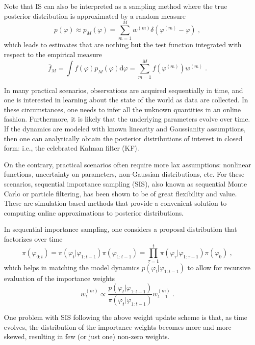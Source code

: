 \documentclass{article}
\newcommand{\ie}{i.e., }
\begin{document}
Note that IS can also be interpreted as a sampling method where the true posterior distribution is approximated by a random measure
\begin{equation}
p(\varphi) \approx p_M(\varphi) = \sum_{m=1}^M w^{(m)} \delta\left(\varphi^{(m)}-\varphi\right) \;,
\end{equation}
which leads to estimates that are nothing but the test function integrated with respect to the empirical measure
\begin{equation}
\bar{f}_M=\int f(\varphi) p_M(\varphi) \mathrm{d}\varphi =  \sum_{m=1}^M f\left(\varphi^{(m)}\right) w^{(m)} \; .
\end{equation}

In many practical scenarios, observations are acquired sequentially in time, and one is interested in learning about the state of the world as data are collected. In these circumstances, one needs to infer all the unknown quantities in an online fashion. Furthermore, it is likely that the underlying parameters evolve over time.  If the dynamics are modeled with known linearity and Gaussianity assumptions, then one can analytically obtain the posterior distributions of interest in closed form: \ie the celebrated Kalman \cite{j-kalm1960} filter (KF).

On the contrary, practical scenarios often require more lax assumptions: nonlinear functions, uncertainty on parameters, non-Gaussian distributions, etc. For these scenarios, sequential importance sampling (SIS), also known as sequential Monte Carlo or particle filtering, has been shown to be of great flexibility and value. These are simulation-based methods that provide a convenient solution to computing online approximations to posterior distributions.

In sequential importance sampling, one considers a proposal distribution that factorizes over time
\begin{equation}
\pi(\varphi_{0:t})=\pi(\varphi_t|\varphi_{1:t-1}) \pi(\varphi_{1:t-1})=\prod_{\tau=1}^{t} \pi(\varphi_{\tau}|\varphi_{1:\tau-1}) \pi(\varphi_0) \; ,
\end{equation}
which helps in matching the model dynamics $p(\varphi_t|\varphi_{1:t-1})$ to allow for recursive evaluation of the importance weights
\begin{equation}
w_t^{(m)} \propto \frac{p(\varphi_{t}|\varphi_{1:t-1})}{\pi(\varphi_{t}|\varphi_{1:t-1})} w_{t-1}^{(m)} \; .
\end{equation}

One problem with SIS following the above weight update scheme is that, as time evolves, the distribution of the importance weights becomes more and more skewed, resulting in few (or just one) non-zero weights.
\end{document}
